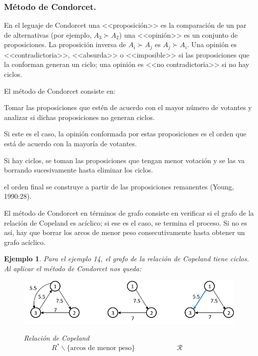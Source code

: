 \documentclass[a5paper,doc,10pt,noapacite]{apa6}
\newtheorem{ejem}{Ejemplo}
\begin{document}
{{\vspace{-0.5\baselineskip}

\subsubsection{Método de Condorcet.}

En el leguaje de Condorcet una <<proposición>> es la comparación de un par de alternativas (por ejemplo, \(A_3 \succ A_2\)) una <<opinión>> es un conjunto de proposiciones. La proposición inversa de \(A_i \succ A_j\) es \(A_j \succ A_i\). Una opinión es <<contradictoria>>, <<absurda>> o <<imposible>> si las proposiciones que la conforman generan un ciclo; una opinión es <<no contradictoria>> si no hay ciclos.

\vspace{1\baselineskip} 
El método de Condorcet consiste en: 
\begin{seriate}
\item Tomar las proposiciones que estén de acuerdo con el mayor número de votantes y analizar si dichas proposiciones no generan ciclos.
\item Si este es el caso, la opinión conformada por estas proposiciones es el orden que está de acuerdo con la mayoría de votantes.
\item Si hay ciclos, se toman las proposiciones que tengan menor votación y se las va borrando sucesivamente hasta eliminar los ciclos.
\item el orden final se construye a partir de las proposiciones remanentes (Young, 1990:28).
\end{seriate}

\vspace{1\baselineskip} 
El método de Condorcet en términos de grafo consiste en verificar si el grafo de la relación de Copeland es acíclico; si ese es el caso, se termina el proceso. Si no es así, hay que borrar los arcos de menor peso consecutivamente hasta obtener un grafo acíclico.

\begin{ejem} Para el ejemplo 14, el grafo de la relación de Copeland tiene ciclos. Al aplicar el método de Condorcet nos queda:

\vspace{-1\baselineskip}

\begin{center}
\begin{figure}[H]
	\fontsize{7}{11}\selectfont
	\captionsetup{justification=centering, labelfont=footnotesize, font=footnotesize}
    \centering
    \caption*{Relación de Copeland \(\qquad \qquad  R^* \backslash \{\text{arcos de menor peso}\} \qquad \qquad  \qquad  \mathcal{R}\)}
    \includegraphics[scale=0.75]{Graficos/fig11_RB}	
    \label{fig:RB_grafo11}
\end{figure}
\end{center}


\end{ejem}}}
\end{document}
